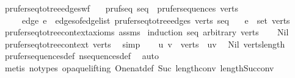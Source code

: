 \begin{isabellebody}
%
\isadelimproof
\isanewline
%
\endisadelimproof
\isanewline
\isanewline
{}\isamarkupfalse%
\ prufer{\isacharunderscore}{\kern0pt}seq{\isacharunderscore}{\kern0pt}to{\isacharunderscore}{\kern0pt}tree{\isacharunderscore}{\kern0pt}edges{\isacharunderscore}{\kern0pt}wf{\isacharcolon}{\kern0pt}\isanewline
\ \ \ pruf{\isacharunderscore}{\kern0pt}seq{\isacharcolon}{\kern0pt}\ {\isachardoublequoteopen}seq\ {\isasymin}\ prufer{\isacharunderscore}{\kern0pt}sequences\ verts{\isachardoublequoteclose}\isanewline
\ \ \ \ \ edge{\isacharcolon}{\kern0pt}\ {\isachardoublequoteopen}e\ {\isasymin}\ edges{\isacharunderscore}{\kern0pt}of{\isacharunderscore}{\kern0pt}edge{\isacharunderscore}{\kern0pt}list\ {\isacharparenleft}{\kern0pt}prufer{\isacharunderscore}{\kern0pt}seq{\isacharunderscore}{\kern0pt}to{\isacharunderscore}{\kern0pt}tree{\isacharunderscore}{\kern0pt}edges\ verts\ seq{\isacharparenright}{\kern0pt}{\isachardoublequoteclose}\isanewline
\ \ \ {\isachardoublequoteopen}e\ {\isasymsubseteq}\ set\ verts{\isachardoublequoteclose}\isanewline
%
\isadelimproof
\ \ %
\endisadelimproof
%
\isatagproof
{}\isamarkupfalse%
\ prufer{\isacharunderscore}{\kern0pt}seq{\isacharunderscore}{\kern0pt}to{\isacharunderscore}{\kern0pt}tree{\isacharunderscore}{\kern0pt}context{\isacharunderscore}{\kern0pt}axioms\ assms\isanewline
{}\isamarkupfalse%
\ {\isacharparenleft}{\kern0pt}induction\ seq\ arbitrary{\isacharcolon}{\kern0pt}\ verts{\isacharparenright}{\kern0pt}\isanewline
\ \ \isamarkupfalse%
\ Nil\isanewline
\ \ \isamarkupfalse%
\ \isamarkupfalse%
\ prufer{\isacharunderscore}{\kern0pt}seq{\isacharunderscore}{\kern0pt}to{\isacharunderscore}{\kern0pt}tree{\isacharunderscore}{\kern0pt}context\ verts\ \isamarkupfalse%
\ simp\isanewline
\ \ \isamarkupfalse%
\ u\ v\ \ {\isachardoublequoteopen}verts\ {\isacharequal}{\kern0pt}\ {\isacharbrackleft}{\kern0pt}u{\isacharcomma}{\kern0pt}v{\isacharbrackright}{\kern0pt}{\isachardoublequoteclose}\ \isamarkupfalse%
\ Nil\ verts{\isacharunderscore}{\kern0pt}length\ \isamarkupfalse%
\ prufer{\isacharunderscore}{\kern0pt}sequences{\isacharunderscore}{\kern0pt}def\ n{\isacharunderscore}{\kern0pt}sequences{\isacharunderscore}{\kern0pt}def\ \isamarkupfalse%
\ auto\isanewline
\ \ \ \ \isamarkupfalse%
\ {\isacharparenleft}{\kern0pt}metis\ {\isacharparenleft}{\kern0pt}no{\isacharunderscore}{\kern0pt}types{\isacharcomma}{\kern0pt}\ opaque{\isacharunderscore}{\kern0pt}lifting{\isacharparenright}{\kern0pt}\ One{\isacharunderscore}{\kern0pt}nat{\isacharunderscore}{\kern0pt}def\ Suc{\isacharunderscore}{\kern0pt}{}\ length{\isacharunderscore}{\kern0pt}{}{\isacharunderscore}{\kern0pt}conv\ length{\isacharunderscore}{\kern0pt}Suc{\isacharunderscore}{\kern0pt}conv{\isacharparenright}{\kern0pt}\isanewline

\end{isabellebody}
